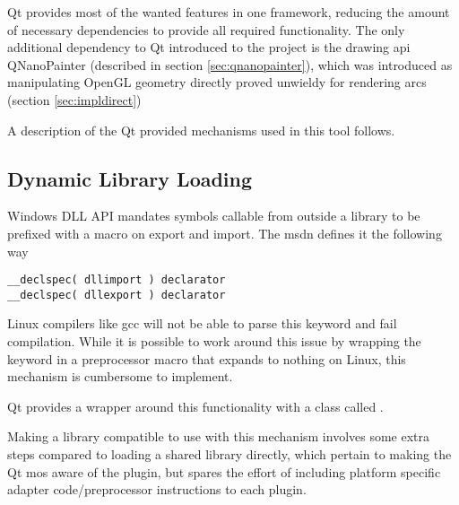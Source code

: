 Qt provides most of the wanted features in one framework, reducing the amount of necessary dependencies to provide all required functionality. The only additional dependency to Qt introduced to the project is the drawing \gls{api} QNanoPainter (described in section \ref{sec:qnanopainter}), which was introduced as manipulating OpenGL geometry directly proved unwieldy for rendering arcs (section \ref{sec:impldirect})

A description of the Qt provided mechanisms used in this tool follows.

\subsection{Dynamic Library Loading}
Windows DLL API mandates symbols callable from outside a library to be prefixed with a macro on export and import. The \gls{msdn} defines it the following way
\begin{lstlisting}
__declspec( dllimport ) declarator  
__declspec( dllexport ) declarator  
\end{lstlisting}

Linux compilers like gcc will not be able to parse this keyword and fail compilation. While it is possible to work around this issue by wrapping the keyword in a preprocessor macro that expands to nothing on Linux, this mechanism is cumbersome to implement.

Qt provides a wrapper around this functionality with a class called .

Making a library compatible to use with this mechanism involves some extra steps compared to loading a shared library directly, which pertain to making the Qt \gls{mos} aware of the plugin, but spares the effort of including platform specific adapter code/preprocessor instructions to each plugin.

